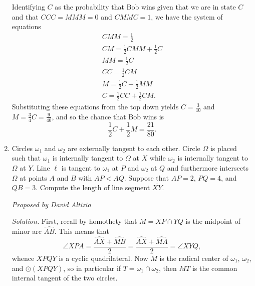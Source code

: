 \documentclass[10pt]{article}
\newcommand{\proposed}[1]
{
\vspace{5pt}
\noindent\textit{Proposed by #1}
}
\newcommand{\solution}
{
\vspace{5pt}
\noindent\textit{Solution.}\qquad
}
\begin{document}
\begin{enumerate}
\begin{center}
\end{center}

Identifying $C$ as the probability that Bob wins given that we are in state $C$ and that $CCC = MMM = 0$ and $CMMC = 1$, we have the system of equations
\begin{gather}
CMM = \frac12 \\
CM = \frac12 CMM + \frac12 C \\
MM = \frac12 C \\
CC = \frac12 CM \\
M = \frac12 C + \frac12 MM \\
C = \frac12 CC + \frac12 CM.
\end{gather}
Substituting these equations from the top down yields $C = \tfrac3{10}$ and $M = \tfrac34 C = \tfrac9{40}$, and so the chance that Bob wins is
\[\frac12 C + \frac12 M = \boxed{\frac{21}{80}}.\]

\item Circles $\omega_1$ and $\omega_2$ are externally tangent to each other.  Circle $\Omega$ is placed such that $\omega_1$ is internally tangent to $\Omega$ at $X$ while $\omega_2$ is internally tangent to $\Omega$ at $Y$.  Line $\ell$ is tangent to $\omega_1$ at $P$ and $\omega_2$ at $Q$ and furthermore intersects $\Omega$ at points $A$ and $B$ with $AP<AQ$.  Suppose that $AP=2$, $PQ=4$, and $QB=3$.  Compute the length of line segment $\overline{XY}$.

\proposed{David Altizio}

\solution First, recall by homothety that $M=XP\cap YQ$ is the midpoint of minor arc $\widehat{AB}$.  This means that \[\angle XPA = \dfrac{\widehat{AX}+\widehat{MB}}2 = \dfrac{\widehat{AX}+\widehat{MA}}2 = \angle XYQ,\] whence $XPQY$ is a cyclic quadrilateral.  Now $M$ is the radical center of $\omega_1$, $\omega_2$, and $\odot(XPQY)$, so in particular if $T=\omega_1\cap\omega_2$, then $MT$ is the common internal tangent of the two circles.


\end{enumerate}
\end{document}
